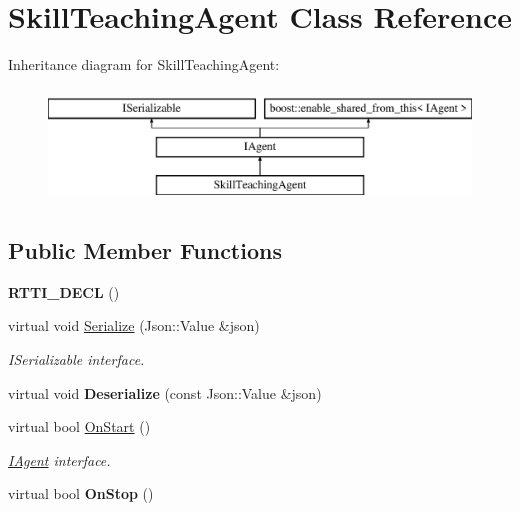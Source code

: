 \hypertarget{class_skill_teaching_agent}{}\section{Skill\+Teaching\+Agent Class Reference}
\label{class_skill_teaching_agent}
Inheritance diagram for Skill\+Teaching\+Agent\+:\begin{figure}[H]
\begin{center}
\leavevmode
\includegraphics[height=3.000000cm]{class_skill_teaching_agent}
\end{center}
\end{figure}
\subsection*{Public Member Functions}
\begin{DoxyCompactItemize}
\item 
\mbox{\label{class_skill_teaching_agent_ad6be91ac5ffdc12f14c826d642033022}} 
{\bfseries R\+T\+T\+I\+\_\+\+D\+E\+CL} ()
\item 
\mbox{\label{class_skill_teaching_agent_a937bce86198b95b062ac136942fb8991}} 
virtual void \hyperlink{class_skill_teaching_agent_a937bce86198b95b062ac136942fb8991}{Serialize} (Json\+::\+Value \&json)
\begin{DoxyCompactList}\small\item\em I\+Serializable interface. \end{DoxyCompactList}\item 
\mbox{\label{class_skill_teaching_agent_ae83352437b728364e2a760b7a84a9b2b}} 
virtual void {\bfseries Deserialize} (const Json\+::\+Value \&json)
\item 
\mbox{\label{class_skill_teaching_agent_a5e7367d8ecffe0a05224084a1e14248a}} 
virtual bool \hyperlink{class_skill_teaching_agent_a5e7367d8ecffe0a05224084a1e14248a}{On\+Start} ()
\begin{DoxyCompactList}\small\item\em \hyperlink{class_i_agent}{I\+Agent} interface. \end{DoxyCompactList}\item 
\mbox{\label{class_skill_teaching_agent_a7de7a873adba3e16f05c348a85d8f881}} 
virtual bool {\bfseries On\+Stop} ()
\end{DoxyCompactItemize}
